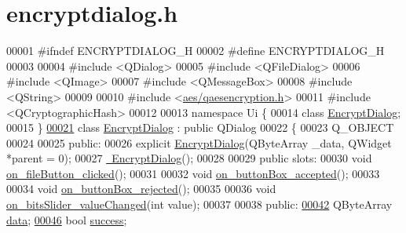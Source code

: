 \hypertarget{encryptdialog_8h_source}{\section{encryptdialog.\-h}
}

\begin{DoxyCode}
00001 \textcolor{preprocessor}{#ifndef ENCRYPTDIALOG\_H}
00002 \textcolor{preprocessor}{}\textcolor{preprocessor}{#define ENCRYPTDIALOG\_H}
00003 \textcolor{preprocessor}{}
00004 \textcolor{preprocessor}{#include <QDialog>}
00005 \textcolor{preprocessor}{#include <QFileDialog>}
00006 \textcolor{preprocessor}{#include <QImage>}
00007 \textcolor{preprocessor}{#include <QMessageBox>}
00008 \textcolor{preprocessor}{#include <QString>}
00009 
00010 \textcolor{preprocessor}{#include <\hyperlink{qaesencryption_8h}{aes/qaesencryption.h}>}
00011 \textcolor{preprocessor}{#include <QCryptographicHash>}
00012 
00013 \textcolor{keyword}{namespace }Ui \{
00014 \textcolor{keyword}{class }\hyperlink{class_encrypt_dialog}{EncryptDialog};
00015 \}
\hypertarget{encryptdialog_8h_source_l00021}{}\hyperlink{class_encrypt_dialog}{00021} \textcolor{keyword}{class }\hyperlink{class_encrypt_dialog}{EncryptDialog} : \textcolor{keyword}{public} QDialog
00022 \{
00023     Q\_OBJECT
00024 
00025 \textcolor{keyword}{public}:
00026     \textcolor{keyword}{explicit} \hyperlink{class_encrypt_dialog_ab57e8b3a0d00c977e81f3b356657524e}{EncryptDialog}(QByteArray \_data, QWidget *parent = 0);
00027     \hyperlink{class_encrypt_dialog_a466e283080f87ee50f172052e43e38b6}{~EncryptDialog}();
00028 
00029 \textcolor{keyword}{public} slots:
00030     \textcolor{keywordtype}{void} \hyperlink{class_encrypt_dialog_ac9817d3f11f44f4bb8d97a228fbdf8a5}{on\_fileButton\_clicked}();
00031 
00032     \textcolor{keywordtype}{void} \hyperlink{class_encrypt_dialog_a9a998acd37db458eede31f4a9cb16b78}{on\_buttonBox\_accepted}();
00033 
00034     \textcolor{keywordtype}{void} \hyperlink{class_encrypt_dialog_a43deb5fd2be501f4d03582a8ed49e9c2}{on\_buttonBox\_rejected}();
00035 
00036     \textcolor{keywordtype}{void} \hyperlink{class_encrypt_dialog_ae5975a58b8ed8f7e423e5d5cc5f58dce}{on\_bitsSlider\_valueChanged}(\textcolor{keywordtype}{int} value);
00037 
00038 \textcolor{keyword}{public}:
\hypertarget{encryptdialog_8h_source_l00042}{}\hyperlink{class_encrypt_dialog_acf3a8bbce90d99ef17fec093c35b1008}{00042}     QByteArray \hyperlink{class_encrypt_dialog_acf3a8bbce90d99ef17fec093c35b1008}{data};
\hypertarget{encryptdialog_8h_source_l00046}{}\hyperlink{class_encrypt_dialog_ada4900bcd40894d9c098c65aa4066ac9}{00046}     \textcolor{keywordtype}{bool} \hyperlink{class_encrypt_dialog_ada4900bcd40894d9c098c65aa4066ac9}{success};

\end{DoxyCode}
